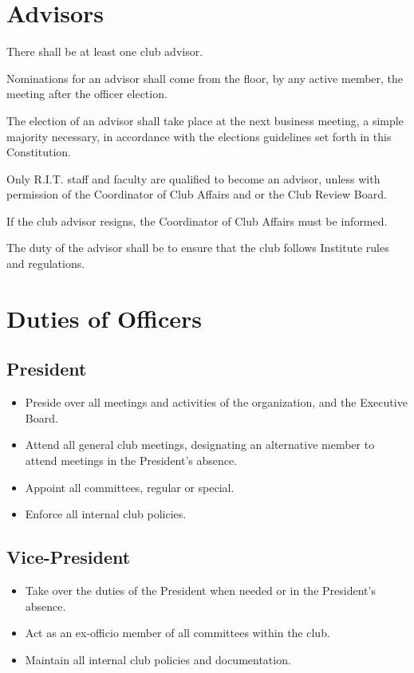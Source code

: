 \section{Advisors}
\begin{subroutines}
\item There shall be at least one club advisor.
\item Nominations for an advisor shall come from the floor, by any active member, the meeting after the officer election.
\item The election of an advisor shall take place at the next business meeting, a simple majority necessary, in accordance with the elections guidelines set forth in this Constitution.
\item Only R.I.T. staff and faculty are qualified to become an advisor, unless with permission of the Coordinator of Club Affairs and or the Club Review Board.
\item If the club advisor resigns, the Coordinator of Club Affairs must be informed.
\item The duty of the advisor shall be to ensure that the club follows Institute rules and regulations.
\end{subroutines}

\section{Duties of Officers}
\subsection{President}
\begin{itemize}
	\item Preside over all meetings and activities of the organization, and the Executive Board.
	\item Attend all general club meetings, designating an alternative member to attend meetings in the President's absence.
	\item Appoint all committees, regular or special.
	\item Enforce all internal club policies.
\end{itemize}
\subsection{Vice-President}
\begin{itemize}
	\item Take over the duties of the President when needed or in the President's absence.
	\item Act as an ex-officio member of all committees within the club.
	\item Maintain all internal club policies and documentation.
\end{itemize}
